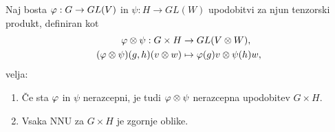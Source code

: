 \begin{trditev}
	Naj bosta $\varphi : G \to GL(V)$ in $\psi : H \to GL (W)$ upodobitvi za njun tenzorski produkt, definiran kot
	\begin{align*}
		\varphi \otimes \psi : G \times H &\to GL (V \otimes W), \\
		(\varphi \otimes \psi) (g,h) (v \otimes w) &\mapsto \varphi(g)v \otimes \psi(h) w,
	\end{align*}
	velja:
	\begin{enumerate}
		\item{\v Ce sta $\varphi$ in $\psi$ nerazcepni, je tudi $\varphi \otimes \psi$ nerazcepna upodobitev $G \times H$.}
		\item{Vsaka NNU za $G \times H$ je zgornje oblike.}
	\end{enumerate}
\end{trditev}

